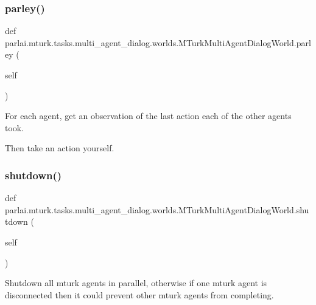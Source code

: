 \subsubsection{\texorpdfstring{parley()}{parley()}}
{\footnotesize\ttfamily def parlai.\+mturk.\+tasks.\+multi\+\_\+agent\+\_\+dialog.\+worlds.\+M\+Turk\+Multi\+Agent\+Dialog\+World.\+parley (\begin{DoxyParamCaption}\item[{}]{self }\end{DoxyParamCaption})}

\begin{DoxyVerb}For each agent, get an observation of the last action each of the other agents
took.

Then take an action yourself.
\end{DoxyVerb}
 \mbox{\label{classparlai_1_1mturk_1_1tasks_1_1multi__agent__dialog_1_1worlds_1_1MTurkMultiAgentDialogWorld_a70cab1449b4b14d88003b075a1a9cd33}} 
\subsubsection{\texorpdfstring{shutdown()}{shutdown()}}
{\footnotesize\ttfamily def parlai.\+mturk.\+tasks.\+multi\+\_\+agent\+\_\+dialog.\+worlds.\+M\+Turk\+Multi\+Agent\+Dialog\+World.\+shutdown (\begin{DoxyParamCaption}\item[{}]{self }\end{DoxyParamCaption})}

\begin{DoxyVerb}Shutdown all mturk agents in parallel, otherwise if one mturk agent is
disconnected then it could prevent other mturk agents from completing.
\end{DoxyVerb}
 

